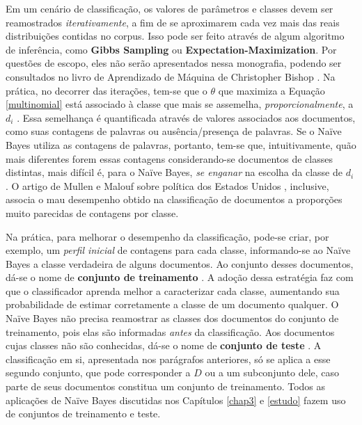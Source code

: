 Em um cenário de classificação, os valores de parâmetros e classes devem ser reamostrados \emph{iterativamente}, a fim de se aproximarem cada vez mais das reais distribuições contidas no corpus. Isso pode ser feito através de algum algoritmo de inferência, como \textbf{Gibbs Sampling} ou \textbf{Expectation-Maximization}. Por questões de escopo, eles não serão apresentados nessa monografia, podendo ser consultados no livro de Aprendizado de Máquina de Christopher Bishop \cite{bishop}. Na prática, no decorrer das iterações, tem-se que o \ensuremath{\theta} que maximiza a Equação \ref{multinomial} está associado à classe que mais se assemelha, \emph{proporcionalmente}, a \ensuremath{d_i} \cite{resnik}. Essa semelhança é quantificada através de valores associados aos documentos, como suas contagens de palavras ou ausência/presença de palavras. Se o Naïve Bayes utiliza as contagens de palavras, portanto, tem-se que, intuitivamente, quão mais diferentes forem essas contagens considerando-se documentos de classes distintas, mais difícil é, para o Naïve Bayes, \emph{se enganar} na escolha da classe de \ensuremath{d_i}. O artigo de Mullen e Malouf sobre política dos Estados Unidos \cite{aaai-politics}, inclusive, associa o mau desempenho obtido na classificação de documentos a proporções muito parecidas de contagens por classe.





Na prática, para melhorar o desempenho da classificação, pode-se criar, por exemplo, um \emph{perfil inicial} de contagens para cada classe, informando-se ao Naïve Bayes a classe verdadeira de alguns documentos. Ao conjunto desses documentos, dá-se o nome de \textbf{conjunto de treinamento} \cite{bishop}. A adoção dessa estratégia faz com que o classificador aprenda melhor a caracterizar cada classe, aumentando sua probabilidade de estimar corretamente a classe de um documento qualquer. O Naïve Bayes não precisa reamostrar as classes dos documentos do conjunto de treinamento, pois elas são informadas \emph{antes} da classificação. Aos documentos cujas classes não são conhecidas, dá-se o nome de \textbf{conjunto de teste} \cite{bishop}. A classificação em si, apresentada nos parágrafos anteriores, só se aplica a esse segundo conjunto, que pode corresponder a \ensuremath{D} ou a um subconjunto dele, caso parte de seus documentos constitua um conjunto de treinamento. Todos as aplicações de Naïve Bayes discutidas nos Capítulos \ref{chap3} e \ref{estudo} fazem uso de conjuntos de treinamento e teste.

